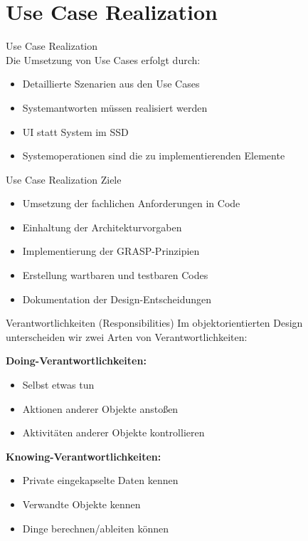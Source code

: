 \section{Use Case Realization} 

\begin{concept}{Use Case Realization}\\
Die Umsetzung von Use Cases erfolgt durch:
\begin{itemize}
    \item Detaillierte Szenarien aus den Use Cases
    \item Systemantworten müssen realisiert werden
    \item UI statt System im SSD
    \item Systemoperationen sind die zu implementierenden Elemente
\end{itemize}
\end{concept}

\begin{theorem}{Use Case Realization Ziele}
\begin{itemize}
    \item Umsetzung der fachlichen Anforderungen in Code
    \item Einhaltung der Architekturvorgaben
    \item Implementierung der GRASP-Prinzipien
    \item Erstellung wartbaren und testbaren Codes
    \item Dokumentation der Design-Entscheidungen
\end{itemize}
\end{theorem}

\begin{definition}{Verantwortlichkeiten (Responsibilities)}
Im objektorientierten Design unterscheiden wir zwei Arten von Verantwortlichkeiten:

\textbf{Doing-Verantwortlichkeiten:}
\begin{itemize}
    \item Selbst etwas tun
    \item Aktionen anderer Objekte anstoßen
    \item Aktivitäten anderer Objekte kontrollieren
\end{itemize}

\textbf{Knowing-Verantwortlichkeiten:}
\begin{itemize}
    \item Private eingekapselte Daten kennen
    \item Verwandte Objekte kennen
    \item Dinge berechnen/ableiten können
\end{itemize}
\end{definition}

